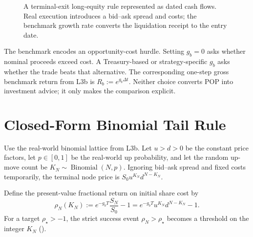 \documentclass[11pt]{article}
\begin{document}
\begin{figure}[ht]
  \centering
  \caption{A terminal-exit long-equity rule represented as dated cash flows. Real execution introduces a bid--ask spread and costs; the benchmark growth rate converts the liquidation receipt to the entry date.}
  \label{fig:trade-rule}
\end{figure}

The benchmark encodes an opportunity-cost hurdle. Setting $g_b=0$ asks whether nominal proceeds exceed cost. A Treasury-based or strategy-specific $g_b$ asks whether the trade beats that alternative. The corresponding one-step gross benchmark return from L3b is $R_b:=e^{g_b\Delta t}$. Neither choice converts POP into investment advice; it only makes the comparison explicit.

\section{Closed-Form Binomial Tail Rule}

Use the real-world binomial lattice from L3b. Let $u>d>0$ be the constant price factors, let $p\in[0,1]$ be the real-world up probability, and let the random up-move count be $K_N\sim\operatorname{Binomial}(N,p)$. Ignoring bid--ask spread and fixed costs temporarily, the terminal node price is $S_0u^{K_N}d^{N-K_N}$.

Define the present-value fractional return on initial share cost by
\begin{equation}
  \label{eq:pv-return}
  \rho_N(K_N):=e^{-g_bT}\frac{S_N}{S_0}-1
  =e^{-g_bT}u^{K_N}d^{N-K_N}-1.
\end{equation}
For a target $\rho_\star>-1$, the strict success event $\rho_N>\rho_\star$ becomes a threshold on the integer $K_N$ ().
\end{document}
